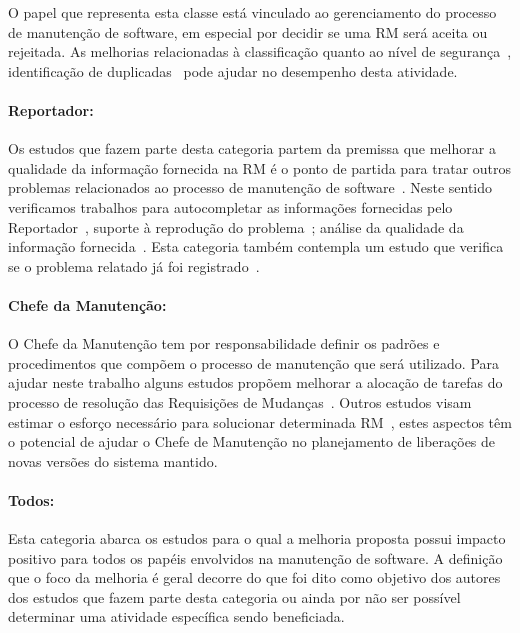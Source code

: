 O papel que representa esta classe está vinculado ao gerenciamento do processo
de manutenção de software, em especial por decidir se uma RM será aceita ou
rejeitada. As melhorias relacionadas à classificação quanto ao
nível de segurança~\cite{gegick2010identifying, zhang2011bug,
    ValdiviaGarcia:2014:CPB:2597073.2597099}, identificação de
duplicadas~\cite{hindle2016contextual, sun2010discriminative,
    alipour2013contextual, banerjee2012automated} pode ajudar no desempenho
desta atividade.

\paragraph{Reportador:}

Os estudos que fazem parte desta categoria  partem da premissa que melhorar a
qualidade da informação fornecida na RM é o ponto de partida para tratar outros
problemas relacionados ao processo de manutenção de
software~\cite{moran2015auto, Moran:2015:EAA:2786805.2807557,
    bettenburg2008makes}.  Neste sentido verificamos trabalhos para
autocompletar as informações fornecidas pelo Reportador~\cite{moran2015auto},
suporte à reprodução do problema~\cite{Moran:2015:EAA:2786805.2807557}; análise
da qualidade da informação fornecida~\cite{bettenburg2008makes,
    Tu:2014:MQI:2677832.2677844}.  Esta categoria também contempla um estudo que
verifica se o problema relatado já foi registrado~\cite{Thung2014}.

\paragraph{Chefe da Manutenção:}

O Chefe da Manutenção tem por responsabilidade definir os padrões e
procedimentos que compõem o processo de manutenção que será utilizado. Para
ajudar neste trabalho alguns estudos propõem melhorar a alocação de tarefas do
processo de resolução das Requisições de Mudanças~\cite{netto2010automated}.
Outros estudos visam estimar o esforço necessário para solucionar determinada
RM~\cite{Vijayakumar2014, Nagwani2010}, estes aspectos têm o potencial de ajudar
o Chefe de Manutenção no planejamento de liberações de novas versões do sistema
mantido.

\paragraph{Todos:}

Esta categoria abarca os estudos para o qual a melhoria proposta possui impacto
positivo para todos os papéis envolvidos na manutenção de software. A definição
que o foco da melhoria é geral decorre do que foi dito como objetivo dos autores
dos estudos que fazem parte desta categoria ou ainda por não ser possível
determinar uma atividade específica sendo beneficiada.

